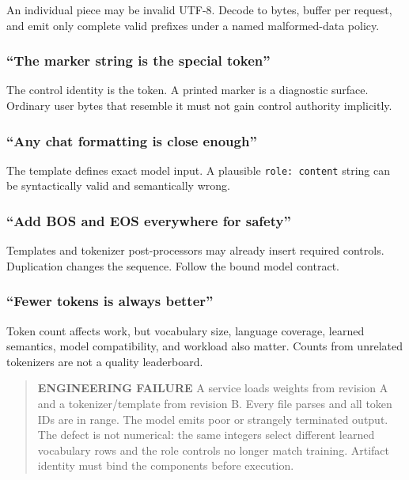 \documentclass[
  10pt,
]{article}
\begin{document}
An individual piece may be invalid UTF-8. Decode to bytes, buffer per
request, and emit only complete valid prefixes under a named
malformed-data policy.

\subsubsection{``The marker string is the special
token''}\label{the-marker-string-is-the-special-token}

The control identity is the token. A printed marker is a diagnostic
surface. Ordinary user bytes that resemble it must not gain control
authority implicitly.

\subsubsection{``Any chat formatting is close
enough''}\label{any-chat-formatting-is-close-enough}

The template defines exact model input. A plausible
\texttt{role:\ content} string can be syntactically valid and
semantically wrong.

\subsubsection{``Add BOS and EOS everywhere for
safety''}\label{add-bos-and-eos-everywhere-for-safety}

Templates and tokenizer post-processors may already insert required
controls. Duplication changes the sequence. Follow the bound model
contract.

\subsubsection{``Fewer tokens is always
better''}\label{fewer-tokens-is-always-better}

Token count affects work, but vocabulary size, language coverage,
learned semantics, model compatibility, and workload also matter. Counts
from unrelated tokenizers are not a quality leaderboard.

\begin{quote}
\textbf{ENGINEERING FAILURE} A service loads weights from revision A and
a tokenizer/template from revision B. Every file parses and all token
IDs are in range. The model emits poor or strangely terminated output.
The defect is not numerical: the same integers select different learned
vocabulary rows and the role controls no longer match training. Artifact
identity must bind the components before execution.
\end{quote}
\end{document}

